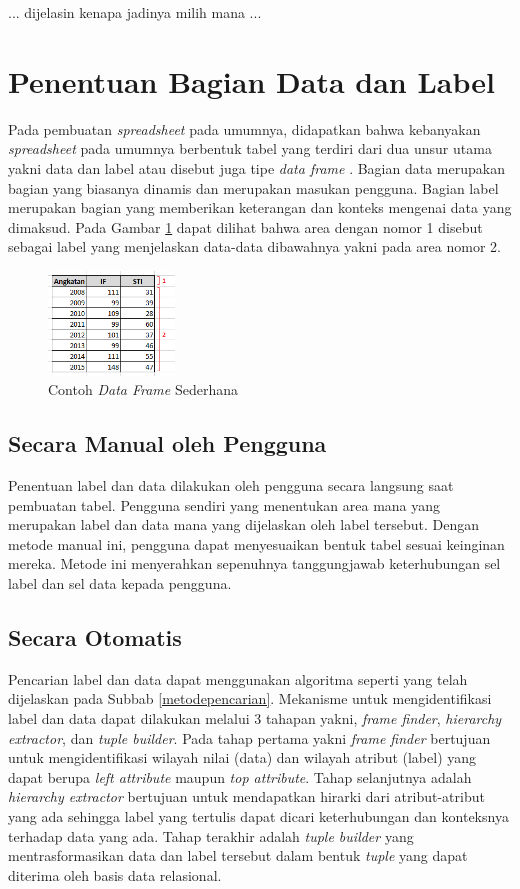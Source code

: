   	... dijelasin kenapa jadinya milih mana ...

\section{Penentuan Bagian Data dan Label}
Pada pembuatan \textit{spreadsheet} pada umumnya, didapatkan bahwa kebanyakan \textit{spreadsheet} pada umumnya berbentuk tabel yang terdiri dari dua unsur utama yakni data dan label atau disebut juga tipe \textit{data frame} \parencite{Chen2013}. Bagian data merupakan bagian yang biasanya dinamis dan merupakan masukan pengguna. Bagian label merupakan bagian yang memberikan keterangan dan konteks mengenai data yang dimaksud. Pada Gambar \ref{DataFrameSederhana} dapat dilihat bahwa area dengan nomor 1 disebut sebagai label yang menjelaskan data-data dibawahnya yakni pada area nomor 2.

\begin{figure}[htb]
    \centering
    \includegraphics[width=0.3\textwidth]{resources/chapter-3-simple-dataframe.png}
    \caption{Contoh \textit{Data Frame} Sederhana}
	\label{DataFrameSederhana}
\end{figure}

	\subsection{Secara Manual oleh Pengguna}
	Penentuan label dan data dilakukan oleh pengguna secara langsung saat pembuatan tabel. Pengguna sendiri yang menentukan area mana yang merupakan label dan data mana yang dijelaskan oleh label tersebut. Dengan metode manual ini, pengguna dapat menyesuaikan bentuk tabel sesuai keinginan mereka. Metode ini menyerahkan sepenuhnya tanggungjawab keterhubungan sel label dan sel data kepada pengguna.

	\subsection{Secara Otomatis}
	Pencarian label dan data dapat menggunakan algoritma seperti yang telah dijelaskan pada Subbab \ref{metodepencarian}. Mekanisme untuk mengidentifikasi label dan data dapat dilakukan melalui 3 tahapan yakni, \textit{frame finder}, \textit{hierarchy extractor}, dan \textit{tuple builder}. Pada tahap pertama yakni \textit{frame finder} bertujuan untuk mengidentifikasi wilayah nilai (data) dan wilayah atribut (label) yang dapat berupa \textit{left attribute} maupun \textit{top attribute}. Tahap selanjutnya adalah \textit{hierarchy extractor} bertujuan untuk mendapatkan hirarki dari atribut-atribut yang ada sehingga label yang tertulis dapat dicari keterhubungan dan konteksnya terhadap data yang ada. Tahap terakhir adalah \textit{tuple builder} yang mentrasformasikan data dan label tersebut dalam bentuk \textit{tuple} yang dapat diterima oleh basis data relasional.

